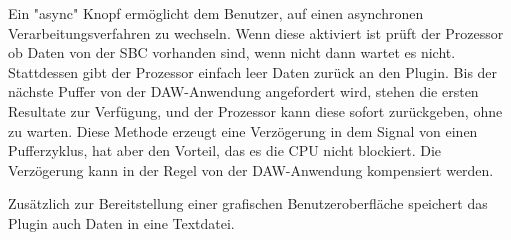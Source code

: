 Ein "async" Knopf ermöglicht dem Benutzer, auf einen asynchronen Verarbeitungsverfahren zu wechseln. Wenn diese aktiviert ist prüft der Prozessor ob Daten von der SBC vorhanden sind, wenn nicht dann wartet es nicht. Stattdessen gibt der Prozessor  einfach leer Daten zurück an den Plugin. Bis der nächste Puffer von der DAW-Anwendung angefordert wird, stehen die ersten Resultate zur Verfügung, und der Prozessor kann diese sofort zurückgeben, ohne zu warten. Diese Methode erzeugt eine Verzögerung in dem Signal von einen Pufferzyklus, hat aber den Vorteil, das es die CPU nicht blockiert. Die Verzögerung kann in der Regel von der DAW-Anwendung kompensiert werden.

Zusätzlich zur Bereitstellung einer grafischen Benutzeroberfläche speichert das Plugin auch Daten in eine Textdatei.